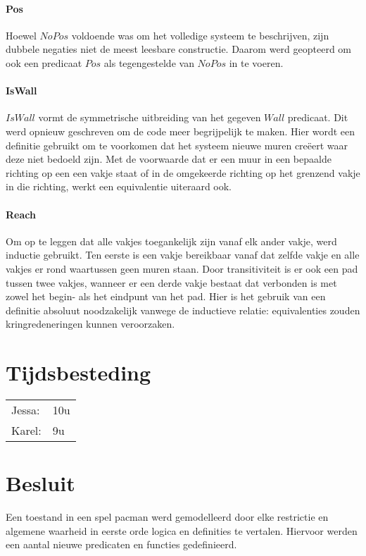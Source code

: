 \documentclass[a4paper,12pt]{article}
\begin{document}


\paragraph{Pos}
Hoewel $NoPos$ voldoende was om het volledige systeem te beschrij\-ven, zijn dubbele negaties niet de meest leesbare constructie.
Daarom werd geopteerd om ook een predicaat $Pos$ als tegengestelde van $NoPos$ in te voe\-ren.

\paragraph{IsWall}
$IsWall$ vormt de symmetrische uitbreiding van het gegeven $Wall$ predicaat. Dit werd opnieuw geschreven om de code meer begrijpelijk te maken.
Hier wordt een definitie gebruikt om te voorkomen dat het systeem nieuwe muren cre\"eert waar deze niet bedoeld zijn. Met de voorwaarde dat er een muur in een bepaalde richting op een een vakje staat of in de omgekeerde richting op het grenzend vakje in die richting, werkt een equivalentie uiteraard ook.

\paragraph{Reach}
Om op te leggen dat alle vakjes toegankelijk zijn vanaf elk ander vakje, werd inductie gebruikt. Ten eerste is een vakje bereikbaar vanaf dat zelfde vakje en alle vakjes er rond waartussen geen muren staan. Door transitiviteit is er ook een pad tussen twee vakjes, wanneer er een derde vakje bestaat dat verbonden is met zowel het begin- als het eindpunt van het pad. Hier is het gebruik van een definitie absoluut noodzakelijk vanwege de inductieve relatie: equivalenties zouden kringredeneringen kunnen veroorzaken.

\section{Tijdsbesteding}
\begin{tabular}{l l}
Jessa: & 10u\\
Karel: & 9u
\end{tabular}

\section{Besluit}
Een toestand in een spel pacman werd gemodelleerd door elke restrictie en algemene waarheid in eerste orde logica en definities te vertalen. Hiervoor werden een aantal nieuwe predicaten en functies gedefinieerd.
\end{document}
